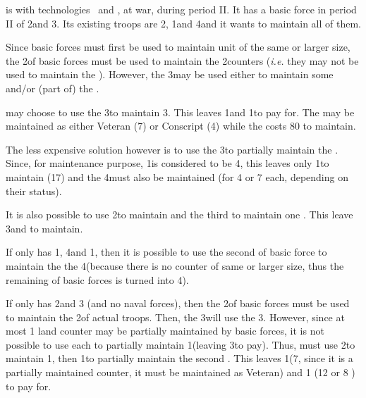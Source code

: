 \begin{exemple}
  \SPA is with technologies \TREN\ and \TGLN, at war, during period II. It has
  a basic force in period II of 2\ARMY\faceplus and 3\GD. Its existing troops
  are 2\ARMY\faceplus, 1\FLEET\faceplus and 4\LD and it wants to maintain all
  of them.

  Since basic forces must first be used to maintain unit of the same or larger
  size, the 2\ARMY\Faceplus of basic forces must be used to maintain the
  2\ARMY\Faceplus counters (\emph{i.e.} they may not be used to maintain the
  \LD). However, the 3\GD may be used either to maintain some \LD and/or (part
  of) the \FLEET.

  \SPA may choose to use the 3\GD to maintain 3\LD. This leaves 1\LD and
  1\FLEET\Faceplus to pay for. The \LD may be maintained as either Veteran
  (7\ducats) or Conscript (4\ducats) while the \FLEET\Faceplus costs 80\ducats
  to maintain.

  The less expensive solution however is to use the 3\GD to partially maintain
  the \FLEET. Since, for maintenance purpose, 1\FLEET\Faceplus is considered
  to be 4\ND, this leaves only 1\ND to maintain (17\ducats) and the 4\LD must
  also be maintained (for 4 or 7 \ducats each, depending on their status).

  It is also possible to use 2\GD to maintain \FLEET\Facemoins and the third
  to maintain one \LD. This leave 3\LD and \FLEET\Facemoins to maintain.

  \smallskip

  If \SPA only has 1\ARMY\Faceplus, 4\LD and 1\FLEET\Faceplus, then it is
  possible to use the second \ARMY\faceplus of basic force to maintain the the
  4\LD (because there is no counter of same or larger size, thus the remaining
  \ARMY\Faceplus of basic forces is turned into 4\LD).

  \smallskip

  If \SPA only has 2\ARMY\Faceplus and 3 \ARMY\Facemoins (and no naval
  forces), then the 2\ARMY\Faceplus of basic forces must be used to maintain
  the 2\ARMY\Faceplus of actual troops. Then, the 3\ARMY\Facemoins will use
  the 3\GD. However, since at most 1 land counter may be partially maintained
  by basic forces, it is not possible to use each \GD to partially maintain
  1\ARMY\Facemoins (leaving 3\LD to pay). Thus, \SPA must use 2\GD to maintain
  1\ARMY\Facemoins, then 1\GD to partially maintain the second
  \ARMY\Facemoins. This leaves 1\LD (7\ducats, since it is a partially
  maintained counter, it must be maintained as Veteran) and 1\ARMY\Facemoins
  (12 or 8 \ducats) to pay for.
\end{exemple}

